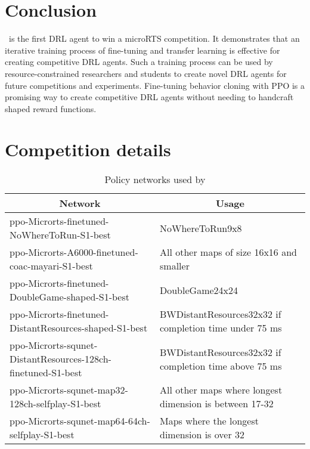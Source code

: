 \documentclass[conference]{IEEEtran}
\begin{document}
\section{Conclusion}
\agentName\ is the first DRL agent to win a microRTS competition. It demonstrates that
an iterative training process of fine-tuning and transfer learning is effective for
creating competitive DRL agents. Such a training process can be used by
resource-constrained researchers and students to create novel DRL agents for future
competitions and experiments. Fine-tuning behavior cloning with PPO is a promising way
to create competitive DRL agents without needing to handcraft shaped reward functions.




\appendices
\section{Competition details}
\begin{table}[H]
    \caption{Policy networks used by \agentName}
    \label{tab:policy-networks}
    \begin{center}
        \begin{tabular}{p{0.5\linewidth}p{0.5\linewidth}}
            \multicolumn{1}{c}{\bf Network}  &\multicolumn{1}{c}{\bf Usage} \\
            \midrule
            ppo-Microrts-finetuned-NoWhereToRun-S1-best & NoWhereToRun9x8 \\ \hline
            ppo-Microrts-A6000-finetuned-coac-mayari-S1-best & All other maps of size 16x16 and smaller \\ \hline
            ppo-Microrts-finetuned-DoubleGame-shaped-S1-best & DoubleGame24x24 \\ \hline
            ppo-Microrts-finetuned-DistantResources-shaped-S1-best & BWDistantResources32x32 if completion time under 75 ms \\ \hline
            ppo-Microrts-squnet-DistantResources-128ch-finetuned-S1-best & BWDistantResources32x32 if completion time above 75 ms \\ \hline
            ppo-Microrts-squnet-map32-128ch-selfplay-S1-best & All other maps where longest dimension is between 17-32 \\ \hline
            ppo-Microrts-squnet-map64-64ch-selfplay-S1-best & Maps where the longest
            dimension is over 32 \\
        \end{tabular}
    \end{center}
\end{table}
\end{document}
